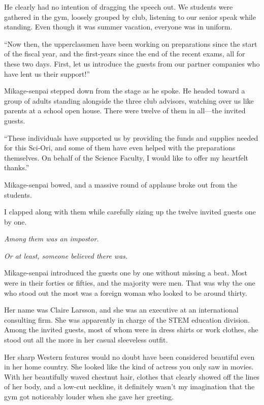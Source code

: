 \documentclass[
    a4paper,
    12pt,
    twoside,
    openany,
    UTF8,
    fontset=windows
]{ctexbook}
\begin{document}
He clearly had no intention of dragging the speech out. We students were gathered in the gym, loosely grouped by club, listening to our senior speak while standing. Even though it was summer vacation, everyone was in uniform.

``Now then, the upperclassmen have been working on preparations since the start of the fiscal year, and the first-years since the end of the recent exams, all for these two days. First, let us introduce the guests from our partner companies who have lent us their support!''

Mikage-senpai stepped down from the stage as he spoke. He headed toward a group of adults standing alongside the three club advisors, watching over us like parents at a school open house. There were twelve of them in all---the invited guests.

``These individuals have supported us by providing the funds and supplies needed for this Sci-Ori, and some of them have even helped with the preparations themselves. On behalf of the Science Faculty, I would like to offer my heartfelt thanks.''

Mikage-senpai bowed, and a massive round of applause broke out from the students.

I clapped along with them while carefully sizing up the twelve invited guests one by one.

\textit{Among them was an impostor.}

\textit{Or at least, someone believed there was.}

Mikage-senpai introduced the guests one by one without missing a beat. Most were in their forties or fifties, and the majority were men. That was why the one who stood out the most was a foreign woman who looked to be around thirty.

Her name was Claire Larsson, and she was an executive at an international consulting firm. She was apparently in charge of the STEM education division. Among the invited guests, most of whom were in dress shirts or work clothes, she stood out all the more in her casual sleeveless outfit.

Her sharp Western features would no doubt have been considered beautiful even in her home country. She looked like the kind of actress you only saw in movies. With her beautifully waved chestnut hair, clothes that clearly showed off the lines of her body, and a low-cut neckline, it definitely wasn't my imagination that the gym got noticeably louder when she gave her greeting.
\end{document}
